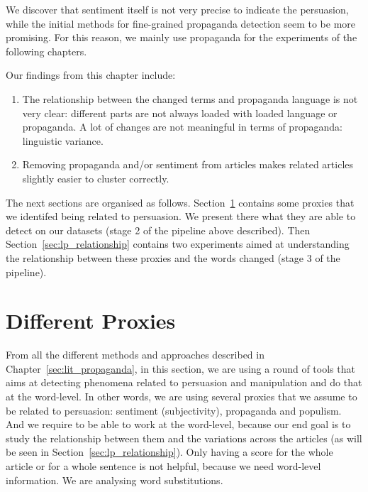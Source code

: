 We discover that sentiment itself is not very precise to indicate the persuasion, while the initial methods for fine-grained propaganda detection seem to be more promising. For this reason, we mainly use propaganda for the experiments of the following chapters. 

Our findings from this chapter include:
\begin{enumerate}
    \item The relationship between the changed terms and propaganda language is not very clear: different parts are not always loaded with loaded language or propaganda. A lot of changes are not meaningful in terms of propaganda: linguistic variance.
    \item Removing propaganda and/or sentiment from articles makes related articles slightly easier to cluster correctly.
\end{enumerate}


The next sections are organised as follows. Section~\ref{sec:lp_proxies} contains some proxies that we identifed being related to persuasion. We present there what they are able to detect on our datasets (stage 2 of the pipeline above described). Then Section~\ref{sec:lp_relationship} contains two experiments aimed at understanding the relationship between these proxies and the words changed (stage 3 of the pipeline).

\section{Different Proxies}
\label{sec:lp_proxies}


From all the different methods and approaches described in Chapter~\ref{sec:lit_propaganda}, in this section, we are using a round of tools that aims at detecting phenomena related to persuasion and manipulation and do that at the word-level.
In other words, we are using several proxies that we assume to be related to persuasion: sentiment (subjectivity), propaganda and populism.
And we require to be able to work at the word-level, because our end goal is to study the relationship between them and the variations across the articles (as will be seen in Section~\ref{sec:lp_relationship}). Only having a score for the whole article or for a whole sentence is not helpful, because we need word-level information. We are analysing word substitutions.

